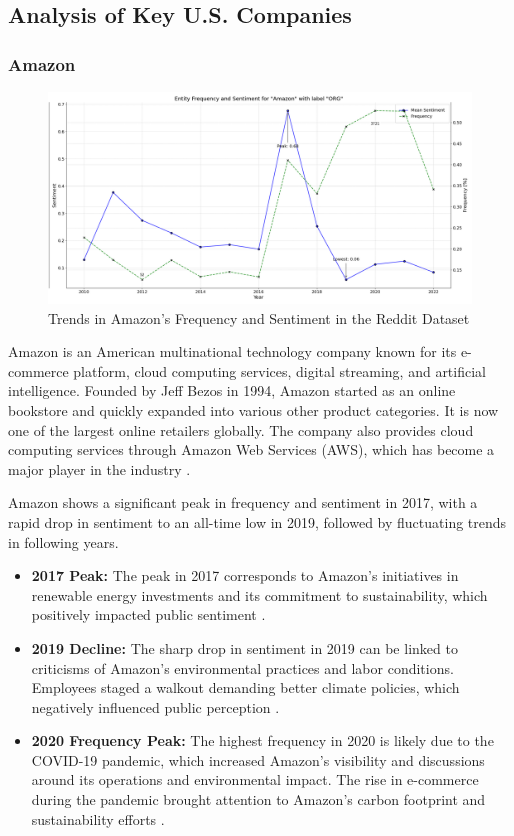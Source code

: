 \subsection{Analysis of Key U.S. Companies}
\subsubsection{Amazon}
\begin{figure}[h]
    \includegraphics[width=\textwidth]{images/topic_details/entities/entity_frequency_Amazon.png}
    \caption{Trends in Amazon's Frequency and Sentiment in the Reddit Dataset}
    \label{fig:entity_amazon}
\end{figure}

Amazon is an American multinational technology company known for its e-commerce platform, cloud computing services, digital streaming, and artificial intelligence. Founded by Jeff Bezos in 1994, Amazon started as an online bookstore and quickly expanded into various other product categories. It is now one of the largest online retailers globally. The company also provides cloud computing services through Amazon Web Services (AWS), which has become a major player in the industry \cite{techtarget2024}.

Amazon shows a significant peak in frequency and sentiment in 2017, with a rapid drop in sentiment to an all-time low in 2019, followed by fluctuating trends in following years.

\begin{itemize}
    \item \textbf{2017 Peak:} The peak in 2017 corresponds to Amazon's initiatives in renewable energy investments and its commitment to sustainability, which positively impacted public sentiment \cite{amazon2017,ventura2017}.
    \item \textbf{2019 Decline:} The sharp drop in sentiment in 2019 can be linked to criticisms of Amazon's environmental practices and labor conditions. Employees staged a walkout demanding better climate policies, which negatively influenced public perception \cite{seattletimes2019}.
    \item \textbf{2020 Frequency Peak:} The highest frequency in 2020 is likely due to the COVID-19 pandemic, which increased Amazon's visibility and discussions around its operations and environmental impact. The rise in e-commerce during the pandemic brought attention to Amazon's carbon footprint and sustainability efforts \cite{moorhead2021amazon}.
\end{itemize}

